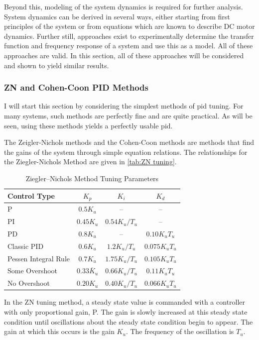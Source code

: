 Beyond this, modeling of the system dynamics is required for further analysis. System dynamics can be derived in several ways, either starting from first principles of the system or from equations which are known to describe DC motor dynamics. Further still, approaches exist to experimentally determine the transfer function and frequency response of a system and use this as a model. All of these approaches are valid. In this section, all of these approaches will be considered and shown to yield similar results.

\subsubsection{ZN and Cohen-Coon PID Methods}
I will start this section by considering the simplest methods of \gls{pid} tuning. For many systems, such methods are perfectly fine and are quite practical. As will be seen, using these methods yields a perfectly usable \gls{pid}.

The Zeigler-Nichols methods and the Cohen-Coon methods are methods that find the gains of the system through simple equation relations. The relationships for the Ziegler-Nichols Method are given in \autoref{tab:ZN tuning}.

\begin{table}[ht]
\centering
\caption{Ziegler–Nichols Method Tuning Parameters}
\begin{tabular}{@{}lccc@{}}
\toprule
\textbf{Control Type} & \( K_p \) & \( K_i \) & \( K_d \) \\
\midrule
P & \( 0.5K_u \) & -- & -- \\
PI & \( 0.45K_u \) & \( 0.54K_u / T_u \) & -- \\
PD & \( 0.8K_u \) & -- & \( 0.10K_u T_u \) \\
Classic PID & \( 0.6K_u \) & \( 1.2K_u / T_u \) & \( 0.075K_u T_u \) \\
Pessen Integral Rule & \( 0.7K_u \) & \( 1.75K_u / T_u \) & \( 0.105K_u T_u \) \\
Some Overshoot & \( 0.33\overline{K}_u \) & \( 0.66K_u / T_u \) & \( 0.11K_u T_u \) \\
No Overshoot & \( 0.20K_u \) & \( 0.40K_u / T_u \) & \( 0.066K_u T_u \) \\
\bottomrule
\end{tabular}
\label{tab:ZN tuning}

\end{table}
In the ZN tuning method, a steady state value is commanded with a controller with only proportional gain, P. The gain is slowly increased at this steady state condition until oscillations about the steady state condition begin to appear. The gain at which this occurs is the gain $K_u$. The frequency of the oscillation is $T_u$.

